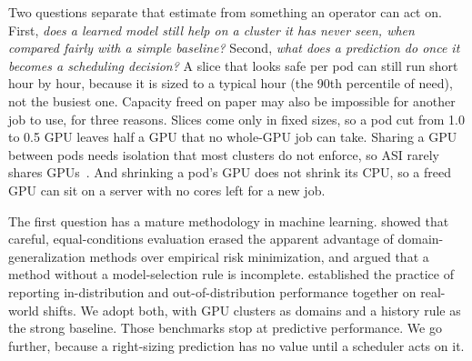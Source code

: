 \documentclass[10pt]{article}
\begin{document}
Two questions separate that estimate from something an operator can act on. First, \emph{does a learned model still help on a cluster it has never seen, when compared fairly with a simple baseline?} Second, \emph{what does a prediction do once it becomes a scheduling decision?} A slice that looks safe per pod can still run short hour by hour, because it is sized to a typical hour (the 90th percentile of need), not the busiest one. Capacity freed on paper may also be impossible for another job to use, for three reasons. Slices come only in fixed sizes, so a pod cut from 1.0 to 0.5 GPU leaves half a GPU that no whole-GPU job can take. Sharing a GPU between pods needs isolation that most clusters do not enforce, so ASI rarely shares GPUs~\citep{li2026asi}. And shrinking a pod's GPU does not shrink its CPU, so a freed GPU can sit on a server with no cores left for a new job.

The first question has a mature methodology in machine learning. \citet{gulrajani2021search} showed that careful, equal-conditions evaluation erased the apparent advantage of domain-generalization methods over empirical risk minimization, and argued that a method without a model-selection rule is incomplete. \citet{koh2021wilds} established the practice of reporting in-distribution and out-of-distribution performance together on real-world shifts. We adopt both, with GPU clusters as domains and a history rule as the strong baseline. Those benchmarks stop at predictive performance. We go further, because a right-sizing prediction has no value until a scheduler acts on it.
\end{document}
